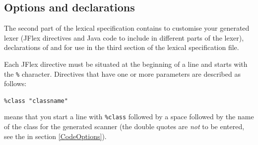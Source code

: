 \documentclass[11pt]{scrartcl}
\begin{document}
\subsection{Options and declarations}\label{SpecOptions}
The second part of the lexical specification contains 
to customise your generated lexer (JFlex directives and Java code to include in
different parts of the lexer), declarations of  and 
 for use in the third section 
 of the lexical specification file.
\label{SpecOptDirectives}

Each JFlex directive must be situated at the beginning of  a line
and starts with the \texttt{\%} character. Directives that have one or
more parameters are described as follows:

\texttt{\%class "classname"}

means that you start a line with \texttt{\%class} followed by a space followed
by the name of the class for the generated scanner (the double quotes are
\emph{not} to be entered, see the  in
section \ref{CodeOptions}).
 
\end{document}
